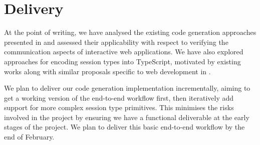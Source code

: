 \documentclass[12pt,twoside]{report}
\begin{document}
%
%

\section{Delivery}
At the point of writing, we have analysed the existing code generation approaches presented in \cite{Hybrid2016, Scribble, Python2017} and assessed their applicability with respect to verifying the communication aspects of interactive web applications. We have also explored approaches for encoding session types into TypeScript, motivated by existing works along with similar proposals specific to web development in \cite{PureScript2019, MVU2019}.

We plan to deliver our code generation implementation incrementally, aiming to get a working version of the end-to-end workflow first, then iteratively add support for more complex session type primitives. This minimises the risks involved in the project by ensuring we have a functional deliverable at the early stages of the project. We plan to deliver this basic end-to-end workflow by the end of February.
\end{document}
